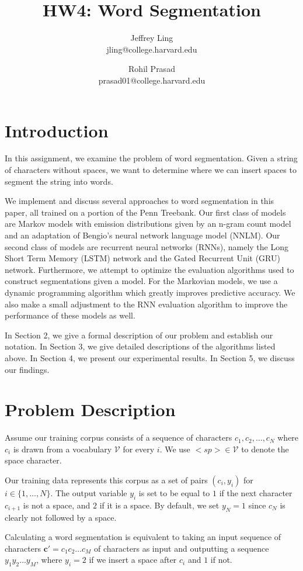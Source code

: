\documentclass[11pt]{article}
\title{HW4: Word Segmentation}
\author{Jeffrey Ling \\ jling@college.harvard.edu \and Rohil Prasad \\ prasad01@college.harvard.edu }
\begin{document}
\maketitle{}
\section{Introduction}

In this assignment, we examine the problem of word segmentation. Given a string of characters without spaces, we want to determine where we can insert spaces to segment the string into words. 

We implement and discuss several approaches to word segmentation in this paper, all trained on a portion of the Penn Treebank. Our first class of models are Markov models with emission distributions given by an n-gram count model and an adaptation of Bengio's neural network language model (NNLM). Our second class of models are recurrent neural networks (RNNs), namely the Long Short Term Memory (LSTM) network and the Gated Recurrent Unit (GRU) network. Furthermore, we attempt to optimize the evaluation algorithms used to construct segmentations given a model. For the Markovian models, we use a dynamic programming algorithm which greatly improves predictive accuracy. We also make a small adjustment to the RNN evaluation algorithm to improve the performance of these models as well. 

In Section 2, we give a formal description of our problem and establish our notation. In Section 3, we give detailed descriptions of the algorithms listed above. In Section 4, we present our experimental results. In Section 5, we discuss our findings.

\section{Problem Description}

Assume our training corpus consists of a sequence of characters $c_1, c_2, \dots, c_N$ where $c_i$ is drawn from a vocabulary $\mathcal{V}$ for every $i$. We use $<sp> \in \mathcal{V}$ to denote the space character. 

Our training data represents this corpus as a set of pairs $(c_i, y_i)$ for $i \in \{1, \dots, N\}$. The output variable $y_i$ is set to be equal to $1$ if the next character $c_{i+1}$ is not a space, and $2$ if it is a space. By default, we set $y_N = 1$ since $c_N$ is clearly not followed by a space. 

Calculating a word segmentation is equivalent to taking an input sequence of characters $\mathbf{c}' = c_1c_2\dots c_M$ of characters as input and outputting a sequence $y_1y_2\dots y_M$, where $y_i = 2$ if we insert a space after $c_i$ and $1$ if not. 
\end{document}
